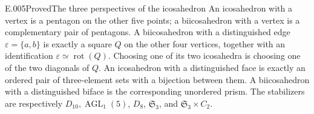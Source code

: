 \begin{saresult}{E.005}{Proved}{The three perspectives of the icosahedron}
An icosahedron with a vertex is a pentagon on the other five points;
a biicosahedron with a vertex is a complementary pair of pentagons.
A biicosahedron with a distinguished edge $\varepsilon=\{a,b\}$ is
exactly a square $Q$ on the other four vertices, together with an
identification $\varepsilon\simeq\operatorname{rot}(Q)$. Choosing one
of its two icosahedra is choosing one of the two diagonals of $Q$.
An icosahedron with a distinguished face is exactly an ordered pair of
three-element sets with a bijection between them. A biicosahedron with
a distinguished biface is the corresponding unordered prism.
The stabilizers are respectively $D_{10},\operatorname{AGL}_1(5)$,
$D_8$, $\mathfrak S_3$, and $\mathfrak S_3\times C_2$.
\end{saresult}
